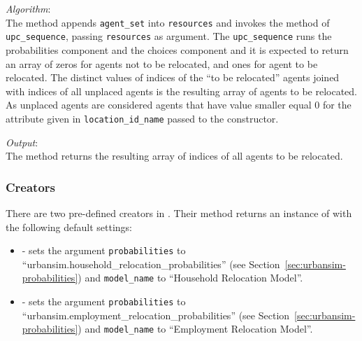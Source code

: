 {\it Algorithm}:~\\[1mm]
The method appends \verb|agent_set| into \verb|resources| and invokes the
 method of \verb|upc_sequence|, passing \verb|resources| as
argument. The \verb|upc_sequence| runs the probabilities component and the
choices component and it is expected to return an array of zeros for agents
not to be relocated, and ones for agent to be relocated. The distinct values
of indices of the ``to be relocated'' agents joined with indices of all
unplaced agents is the resulting array of agents to be relocated. As unplaced
agents are considered agents that have value smaller equal 0 for the attribute \attributesindex
given in \verb|location_id_name| passed to the constructor.

{\it Output}:~\\[1mm]
The method returns the resulting array of indices of all agents to be
relocated.

%
\subsubsection{Creators}
%
There are two pre-defined creators in . Their method
 \modelsindex returns an instance of
 \modelsindex with the following default settings:
\begin{itemize}
\item {} \modelsindex - sets the argument
  \verb|probabilities| to ``urbansim.household_relocation_probabilities''
  (see Section~\ref{sec:urbansim-probabilities}) and \verb|model_name| \modelsindex to
  ``Household Relocation Model''. \modelsindex
\item {} \modelsindex - sets the argument
  \verb|probabilities| to
  ``urbansim.employment_relocation_probabilities'' (see
  Section~\ref{sec:urbansim-probabilities}) and \verb|model_name| \modelsindex to
  ``Employment Relocation Model''.  \modelsindex
\end{itemize}

%
